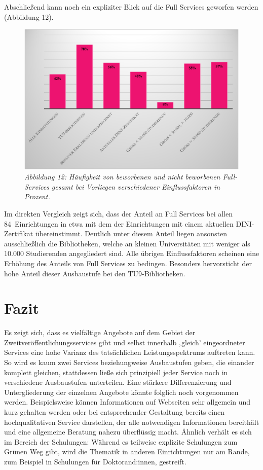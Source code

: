 \documentclass[a4paper,
fontsize=11pt,
oneside,
numbers=noperiodatend,
parskip=half-,
bibliography=totoc,
final
]{scrartcl}
\begin{document}
Abschließend kann noch ein expliziter Blick auf die Full Services
geworfen werden (Abbildung 12).

\begin{figure}[h!]
\centering
\includegraphics[width=.9\textwidth]{img/abb12.png}
\caption{\textit{Abbildung 12: Häufigkeit von beworbenen und nicht beworbenen
Full-Services gesamt bei Vorliegen verschiedener Einflussfaktoren in
Prozent.}}
\end{figure}

Im direkten Vergleich zeigt sich, dass der Anteil an Full Services bei
allen 84~Einrichtungen in etwa mit dem der Einrichtungen mit einem
aktuellen DINI-Zertifikat übereinstimmt. Deutlich unter diesem Anteil
liegen ansonsten ausschließlich die Bibliotheken, welche an kleinen
Universitäten mit weniger als 10.000 Studierenden angegliedert sind.
Alle übrigen Einflussfaktoren scheinen eine Erhöhung des Anteils von
Full Services zu bedingen. Besonders hervorsticht der hohe Anteil dieser
Ausbaustufe bei den TU9-Bibliotheken.

\pagebreak 

\hypertarget{fazit}{%
\section{Fazit}\label{fazit}}

Es zeigt sich, dass es vielfältige Angebote auf dem Gebiet der
Zweitveröffentlichungsservices gibt und selbst innerhalb ‚gleich'
eingeordneter Services eine hohe Varianz des tatsächlichen
Leistungsspektrums auftreten kann. So wird es kaum zwei Services
beziehungweise Ausbaustufen geben, die einander komplett gleichen,
stattdessen ließe sich prinzipiell jeder Service noch in verschiedene
Ausbaustufen unterteilen. Eine stärkere Differenzierung und
Untergliederung der einzelnen Angebote könnte folglich noch vorgenommen
werden. Beispielsweise können Informationen auf Webseiten sehr allgemein
und kurz gehalten werden oder bei entsprechender Gestaltung bereits
einen hochqualitativen Service darstellen, der alle notwendigen
Informationen bereithält und eine allgemeine Beratung nahezu überflüssig
macht. Ähnlich verhält es sich im Bereich der Schulungen: Während es
teilweise explizite Schulungen zum Grünen Weg gibt, wird die Thematik in
anderen Einrichtungen nur am Rande, zum Beispiel in Schulungen für
Doktorand:innen, gestreift.
\end{document}
